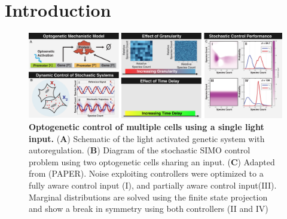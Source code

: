 \documentclass[12pt]{article}
\begin{document}
%
%
%
\maketitle
% 

\section{Introduction}
\begin{figure}
\begin{center}
\includegraphics[width=\columnwidth]{CartoonAndController.pdf}
\caption{{\bf Optogenetic control of multiple cells using a single light input.}
({\bf A}) Schematic of the light activated genetic system with autoregulation.
({\bf B}) Diagram of the stochastic SIMO control problem using two optogenetic cells sharing an input.
({\bf C}) Adapted from (PAPER). Noise exploiting controllers were optimized to a fully aware control input (I), and partially aware control input(III). Marginal distributions are solved using the finite state projection and show a break in symmetry using both controllers (II and IV) }
\label{cartoons}
\end{center}
\vspace{-0.3in}
\end{figure}
\end{document}
